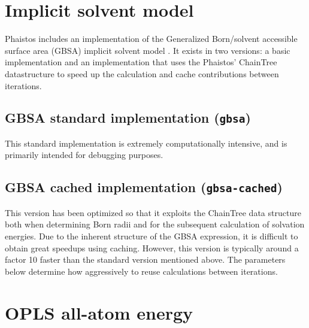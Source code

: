\section{Implicit solvent model}

Phaistos includes an implementation of the Generalized Born/solvent
accessible surface area (GBSA) implicit solvent model
\cite{qiu1997gbsa}. It exists in two versions: a basic implementation
and an implementation that uses the Phaistos' ChainTree datastructure
\cite{lotan2004algorithm} to speed up the calculation and cache
contributions between iterations.

\subsection{GBSA standard implementation (\texttt{gbsa})}

This standard implementation is extremely computationally intensive,
and is primarily intended for debugging purposes.

\subsection{GBSA cached implementation (\texttt{gbsa-cached})}

This version has been optimized so that it exploits the ChainTree
data structure both when determining Born radii and for the subsequent
calculation of solvation energies. Due to the inherent structure of
the GBSA expression, it is difficult to obtain great speedups using
caching. However, this version is typically around a factor 10 faster
than the standard version mentioned above. The parameters below
determine how aggressively to reuse calculations between iterations.

\begin{optiontable}
\end{optiontable}



\section{OPLS all-atom energy}

